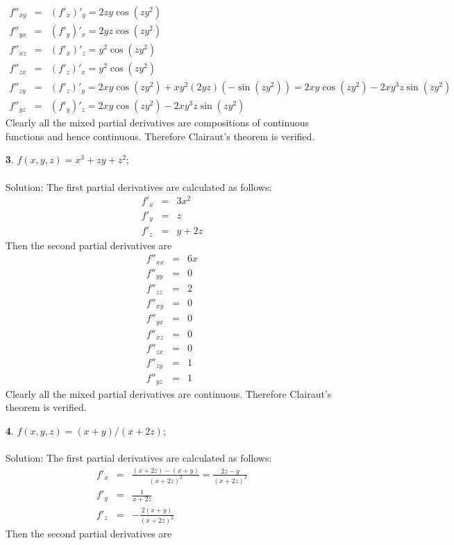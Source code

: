 \documentclass[12pt]{amsbook}
\begin{document}
\begin{enumerate}
\begin{eqnarray*}
f''_{xy}&=& (f'_x)'_y= 2zy\cos(zy^2)\\
f''_{yx}&=& (f'_y)'_x= 2yz\cos(zy^2)\\
f''_{xz}&=& (f'_x)'_z= y^2\cos(zy^2)\\
f''_{zx}&=& (f'_z)'_x= y^2\cos(zy^2)\\
f''_{zy}&=& (f'_z)'_y= 2xy\cos(zy^2)+xy^2(2yz)(-\sin(zy^2)) = 2xy\cos(zy^2)-2xy^3z\sin(zy^2)\\
f''_{yz}&=& (f'_y)'_z= 2xy\cos(zy^2) - 2xy^3z\sin(zy^2)
\end{eqnarray*}
Clearly all the mixed partial derivatives are compositions of continuous functions and hence continuous. Therefore Clairaut's theorem is verified.
\\
\item[{\small\bf 3}.] $f(x,y,z)=x^3+zy+z^2$;
\\
\\
{\sc Solution}: The first partial derivatives are calculated as follows:
\begin{eqnarray*}
f'_x&=&3x^2 \\
f'_y&=&z \\
f'_z&=&y+2z
\end{eqnarray*}
Then the second partial derivatives are
\begin{eqnarray*}
f''_{xx}&=& 6x \\
f''_{yy}&=& 0 \\
f''_{zz}&=& 2 \\
f''_{xy}&=& 0 \\
f''_{yx}&=& 0 \\
f''_{xz}&=& 0 \\
f''_{zx}&=& 0 \\
f''_{zy}&=& 1 \\
f''_{yz}&=& 1
\end{eqnarray*}
Clearly all the mixed partial derivatives are  continuous. Therefore Clairaut's theorem is verified.
\\
\item[{\small\bf 4}.] $f(x,y,z)=(x+y)/(x+2z)$;
\\
\\
{\sc Solution}: The first partial derivatives are calculated as follows:
\begin{eqnarray*}
f'_x&=& \frac{(x+2z)-(x+y)}{(x+2z)^2}=\frac{2z-y}{(x+2z)^2}  \\
f'_y&=& \frac{1}{x+2z} \\
f'_z&=& -\frac{2(x+y)}{(x+2z)^2}
\end{eqnarray*}
Then the second partial derivatives are

\end{enumerate}
\end{document}
